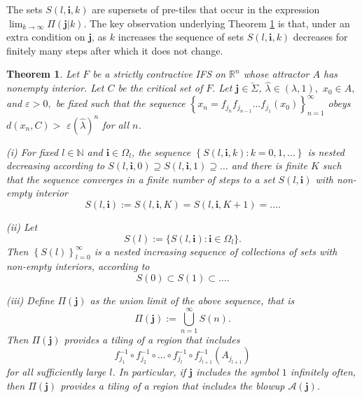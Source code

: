 \documentclass{amsproc}%
\newtheorem{theorem}{Theorem}
\theoremstyle{plain}
\theoremstyle{definition}
\numberwithin{equation}{section}
\begin{document}
The sets $S(l,\mathbf{i},k)$ are supersets of pre-tiles that occur in the
expression $\lim_{k\rightarrow\infty}\Pi(\mathbf{j}|k)$. The key observation
underlying Theorem \ref{tiling theorem} is that, under an extra condition on
$\mathbf{j}$, as $k$ increases the sequence of sets $S(l,\mathbf{i},k)$
decreases for finitely many steps after which it does not change.

\begin{theorem}
\label{tiling theorem} Let $F$ be a strictly contractive IFS on $\mathbb{R}%
^{n}$ whose attractor $A$ has nonempty interior. Let $C$ be the critical set
of $F.$ Let $\mathbf{j\in}\overleftarrow{\Sigma}$, $\widehat{\lambda}%
\in(\lambda,1),$ $x_{0}\in A,$ and $\varepsilon>0,$ be fixed such that the
sequence $\left\{  x_{n}=f_{j_{n}}f_{j_{n-1}}\dots f_{j_{1}}(x_{0})\right\}
_{n=1}^{\infty}$ obeys $d(x_{n},C)>$ $\varepsilon\left(  \widehat{\lambda
}\right)  ^{n}$ for all $n$.

(i) For fixed $l\in\mathbb{N}$ and $\mathbf{i\in}\Omega_{l}$, the sequence
$\left\{  S(l,\mathbf{i},k):k=0,1,\dots\right\}  $ is nested decreasing
according to $S(l,\mathbf{i},0)\supseteq S(l,\mathbf{i},1)\supseteq\dots$ and
there is finite $K$ such that the sequence converges in a finite number of
steps to a set $S(l,\mathbf{i})$ with non-empty interior%
\[
S(l,\mathbf{i}):=S(l,\mathbf{i},K)=S(l,\mathbf{i},K+1)=\dots.
\]


(ii) Let%
\[
S(l):=\{S(l,\mathbf{i}):\mathbf{i}\in\Omega_{l}\}.
\]
Then $\left\{  S(l)\right\}  _{l=0}^{\infty}$ is a nested increasing sequence
of collections of sets with non-empty interiors, according to
\[
S(0)\subset S(1)\subset\dots.
\]


(iii) Define $\Pi(\mathbf{j})$ as the union limit of the above sequence, that
is
\[
\Pi(\mathbf{j}):=%
{\textstyle\bigcup\limits_{n=1}^{\infty}}
S(n).
\]
Then $\Pi(\mathbf{j})$ provides a tiling of a region that includes
\[
f_{j_{1}}^{-1}\circ f_{j_{2}}^{-1}\circ\dots\circ f_{j_{l}}^{-1}\circ
f_{j_{l+1}}^{-1}(A_{j_{l+1}})
\]
for all sufficiently large $l$. In particular, if $\mathbf{j}$ includes the
symbol $1$ infinitely often, then $\Pi(\mathbf{j})$ provides a tiling of a
region that includes the blowup $\mathcal{A}\left(  \mathbf{j}\right)  $.
\end{theorem}
\end{document}
